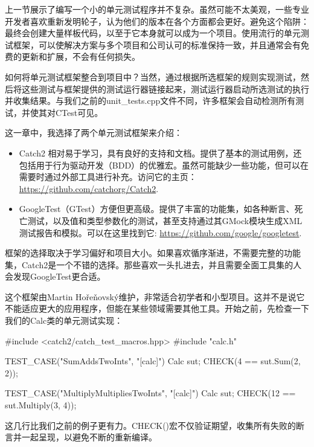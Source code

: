 
上一节展示了编写一个小的单元测试程序并不复杂。虽然可能不太美观，一些专业开发者喜欢重新发明轮子，认为他们的版本在各个方面都会更好。避免这个陷阱：最终会创建大量样板代码，以至于它本身就可以成为一个项目。使用流行的单元测试框架，可以使解决方案与多个项目和公司认可的标准保持一致，并且通常会有免费的更新和扩展，不会有任何损失。

如何将单元测试框架整合到项目中？当然，通过根据所选框架的规则实现测试，然后将这些测试与框架提供的测试运行器链接起来，测试运行器启动所选测试的执行并收集结果。与我们之前的unit\_tests.cpp文件不同，许多框架会自动检测所有测试，并使其对CTest可见。

这一章中，我选择了两个单元测试框架来介绍：

\begin{itemize}
\item
Catch2 相对易于学习，具有良好的支持和文档。提供了基本的测试用例，还包括用于行为驱动开发（BDD）的优雅宏。虽然可能缺少一些功能，但可以在需要时通过外部工具进行补充。访问它的主页： \url{https://github.com/catchorg/Catch2}.

\item
GoogleTest（GTest）方便但更高级。提供了丰富的功能集，如各种断言、死亡测试，以及值和类型参数化的测试，甚至支持通过其GMock模块生成XML测试报告和模拟。可以在这里找到它: \url{https://github.com/google/googletest}.
\end{itemize}

框架的选择取决于学习偏好和项目大小。如果喜欢循序渐进，不需要完整的功能集，Catch2是一个不错的选择。那些喜欢一头扎进去，并且需要全面工具集的人会发现GoogleTest更合适。


这个框架由Martin Hořeňovský维护，非常适合初学者和小型项目。这并不是说它不能适应更大的应用程序，但能在某些领域需要其他工具。开始之前，先检查一下我们的Calc类的单元测试实现：


\begin{cpp}
#include <catch2/catch_test_macros.hpp>
#include "calc.h"

TEST_CASE("SumAddsTwoInts", "[calc]") {
    Calc sut;
    CHECK(4 == sut.Sum(2, 2));
}

TEST_CASE("MultiplyMultipliesTwoInts", "[calc]") {
    Calc sut;
    CHECK(12 == sut.Multiply(3, 4));
}
\end{cpp}

这几行比我们之前的例子更有力。CHECK()宏不仅验证期望，收集所有失败的断言并一起呈现，以避免不断的重新编译。

